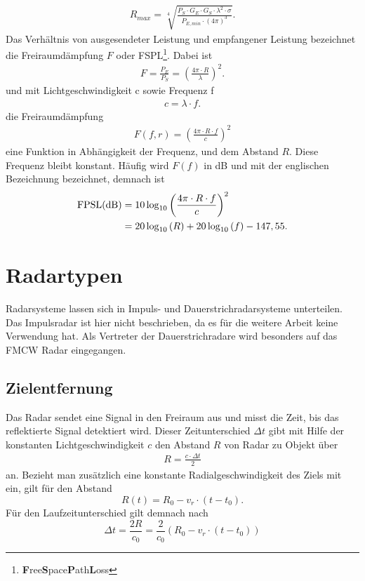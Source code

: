 \begin{align}
R_{max} = \sqrt[4]{\frac{P_{S} \cdot G_{E}\cdot G_{S} \cdot \lambda^2 \cdot \sigma}{P_{E,min} \cdot (4\pi)^3}}.
\end{align}
Das Verhältnis von ausgesendeter Leistung und empfangener Leistung bezeichnet die Freiraumdämpfung $F$ oder FSPL\footnote{\textbf{F}ree\textbf{S}pace\textbf{P}ath\textbf{L}oss}. Dabei ist
\begin{align}
F = \frac{P_{E}}{P_{S}} = \left(\frac{4\pi \cdot R}{\lambda}\right)^2.
\end{align} 
und mit Lichtgeschwindigkeit c sowie Frequenz f
\begin{align}
c = \lambda \cdot f.
\label{eq:fzulambda}
\end{align}
die Freiraumdämpfung
\begin{align}
F(f,r) = \left(\frac{4\pi \cdot R \cdot f}{c}\right)^2
\end{align}
eine Funktion in Abhängigkeit der Frequenz, und dem Abstand $R$. Diese Frequenz bleibt konstant. Häufig wird $F(f)$ in dB und mit der englischen Bezeichnung bezeichnet, demnach ist
\begin{align}
\text{FPSL(dB)} &= 10\log_{10}\left(\frac{4\pi \cdot R \cdot f}{c}\right)^2 \notag \\
&= 20 \log_{10}\left( R \right) + 20 \log_{10}\left( f \right) - 147,55 .
\end{align}

\section{Radartypen}
Radarsysteme lassen sich in Impuls- und Dauerstrichradarsysteme unterteilen. Das Impulsradar ist hier nicht beschrieben, da es für die weitere Arbeit keine  Verwendung hat. Als Vertreter der Dauerstrichradare wird besonders auf das FMCW Radar eingegangen.

\subsection{Zielentfernung}
Das Radar sendet eine Signal in den Freiraum aus und misst die Zeit, bis das reflektierte Signal detektiert wird. Dieser Zeitunterschied $\Delta t$ gibt mit Hilfe der konstanten Lichtgeschwindigkeit $c$ den Abstand $R$ von Radar zu Objekt über
\begin{align}
R = \frac{c \cdot \Delta t}{2} 
\end{align} 
an. Bezieht man zusätzlich eine konstante Radialgeschwindigkeit des Ziels mit ein, gilt für den Abstand 
\begin{equation}
R(t) = R_{0} - v_{r} \cdot \left( t-t_{0}\right).
\end{equation}
Für den Laufzeitunterschied gilt demnach nach \cite[Gl. 3.1.11]{HuderRadar}
\begin{equation}
\Delta t = \frac{2R}{c_{0}}
		 = \frac{2}{c_{0}}\left(R_{0} - v_{r} \cdot \left( t-t_{0}\right)\right)
\label{eq:AbstandZuDeltaT}
\end{equation}

